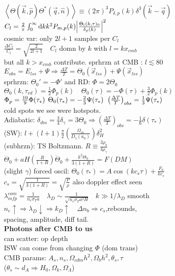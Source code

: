 \documentclass[12pt]{article}
\newcommand*\diff{\mathop{}\!\mathrm{d}}
\begin{document}
{	\\$\left<\Theta(\vec{k},\hat{p})\Theta^*(\vec{q},\hat{n})\right>\equiv(2\pi)^3P_{\delta,p}(k)\delta^3(\vec{k}-\vec{q})$
	\\$C_l=\frac{2}{\pi}\int_0^\infty\diff k k^2P_{m,p}(k)\abs{\frac{\Theta_l(k,\tau)_0}{\delta_p(k)}}^2$
	\\cosmic var: only $2l + 1$ samples per $C_l$
	\\$\frac{\Delta C_l}{C_l}=\sqrt{\frac{2}{2l+1}} \quad C_l$ domn by $k$ with $l=kx_{cmb}$ 
	\\but all $k>x_{cmb}$ contribute. sprhrzn at CMB : $l \lesssim 80$
	\\$E_{obs}=E_{lss}+\Psi \Rightarrow \frac{\Delta T}{T}=\Theta_0(\vec{x}_{lss})+\Psi(\vec{x}_{lss})$
	\\sprhrzn: $\Theta_0'=-\Phi'$ and RD: $\Phi=2\Theta_0$
	\\$\Theta_0(k,\tau_{rd})=\frac{1}{2}\Phi_p(k) \quad \Theta_0(\tau)=-\Phi(\tau)+\frac{3}{2}\Phi_p(k)$
	\\$\Phi_p=\frac{10}{9}\Phi(\tau_*) \quad\hspace{-0.2cm} \Theta_0(\tau_*)=-\frac{2}{3}\Psi(\tau_*) \quad\hspace{-0.2cm} \left(\frac{\Delta T}{T}\right)_{obs}=\frac{1}{3}\Psi(\tau_*)$
	\\cold spots we see were hotspots.
	\\Adiabatic: $\delta_{dm}=\frac{3}{4}\delta_\gamma=3\Theta_0\Rightarrow  \left(\frac{\Delta T}{T}\right)_{obs}=-\frac{1}{6}\delta(\tau_*)$
	\\(SW): $l+(l+1)\frac{\pi}{2}\left(\frac{\Omega_m}{D_1(a_0)}\right)\delta_H^2$
	\\(subhrzn): TS Boltzmann. $R\equiv\frac{3\rho_b}{4\rho_\gamma}$
	\\$\ddot{\Theta}_0+aH\left(\frac{R}{1+R}\right)\dot{\Theta}_0+\frac{k^2\Theta_0}{3(1+R)}=F(DM)$
	\\(slight $\gamma$) forced oscil: $\Theta_0(\tau_*)=A\cos(kc_s\tau)+\frac{F_0}{kc_s}$
	\\$c_s=\sqrt{\frac{1}{3(1+R)}}=\sqrt{\frac{P}{\rho}}$ also doppler effect seen
	\\$\lambda^{com}_{mfp}=\frac{1}{n_e\sigma_Ta}\quad \lambda_D\sim\frac{1}{\sqrt{n_e\sigma_Ta^2H}} \quad k\gg 1/\lambda_D$ smooth
	\\$n_e\uparrow\Rightarrow\lambda_D\downarrow\Rightarrow k_D\uparrow \quad \Delta n_b\Rightarrow c_s$,rebounds, 
	\\spacing, amplitude, diff tail.
	\\\textbf{Photons after CMB to us}
	\\can scatter: op depth
	\\ISW can come from changing $\Phi$ (dom trans)
	\\CMB params: $A_s, n_s, \Omega_{cdm}h^2,\Omega_bh^2,\theta_s, \tau$
	\\($\theta_s\sim d_A\Rightarrow H_0,\Omega_k,\Omega_\Lambda$)
}
\end{document}
